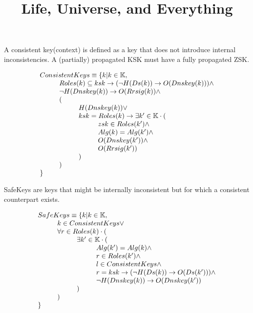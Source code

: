 \documentclass{article}
\title{Life, Universe, and Everything}
\begin{document}
\maketitle

A consistent key(context) is defined as a key that does not introduce 
internal inconsistencies. A (partially) propagated KSK must have a fully
propagated ZSK.

\begin{displaymath}
\begin{array}{l}
ConsistentKeys \equiv \{ k | k\in\mathbb{K}, \\
\hskip 1cm	Roles(k) \subseteq {ksk} \rightarrow (\neg H(Ds(k)) \rightarrow O(Dnskey(k))) \wedge \\
\hskip 1cm	\neg H(Dnskey(k)) \rightarrow O(Rrsig(k)) \wedge \\
\hskip 1cm	( \\
\hskip 2cm		H(Dnskey(k)) \vee \\
\hskip 2cm		ksk=Roles(k) \rightarrow \exists k' \in \mathbb{K} \cdot (\\
\hskip 3cm			zsk \in Roles(k') \wedge \\
\hskip 3cm			Alg(k)=Alg(k') \wedge \\
\hskip 3cm			O(Dnskey(k')) \wedge \\
\hskip 3cm			O(Rrsig(k'))\\
\hskip 2cm		)\\
\hskip 1cm	)\\
\}
\end{array}
\end{displaymath}

SafeKeys are keys that might be internally inconsistent but for which
a consistent counterpart exists.

\begin{displaymath}
\begin{array}{l}
SafeKeys \equiv \{ k | k\in\mathbb{K}, \\
\hskip 1cm 		k \in ConsistentKeys \vee \\
\hskip 1cm 		\forall r \in Roles(k) \cdot ( \\
\hskip 2cm 			\exists k' \in \mathbb{K} \cdot ( \\
\hskip 3cm 				Alg(k') = Alg(k) \wedge \\
\hskip 3cm 				r \in Roles(k') \wedge \\
\hskip 3cm 				l \in ConsistentKeys \wedge \\
\hskip 3cm 				r = ksk \rightarrow (\neg H(Ds(k)) \rightarrow O(Ds(k'))) \wedge \\
\hskip 3cm 				\neg H(Dnskey(k)) \rightarrow O(Dnskey(k')) \\
\hskip 2cm 			)\\
\hskip 1cm 		)\\
\}
\end{array}
\end{displaymath}
\end{document}
